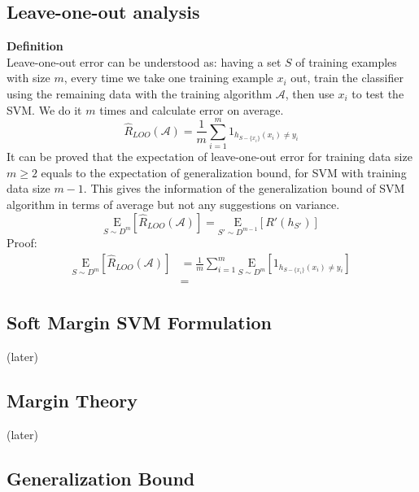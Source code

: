 \documentclass[12pt]{article}
\theoremstyle{definition}
\theoremstyle{remark}
\numberwithin{equation}{section}
\begin{document}
\subsection{Leave-one-out analysis}
\textbf{Definition} \\[0.2cm]
Leave-one-out error can be understood as: having a set $S$ of training examples with size $m$, every time we take one training example $x_i$ out, train the classifier using the remaining data with the training algorithm $\mathcal{A}$, then use $x_i$ to test the SVM. We do it $m$ times and calculate error on average.
\[\widehat{R}_{LOO}(\mathcal{A})=\frac{1}{m}\sum_{i=1}^{m}1_{h_{S-\{x_i\}}(x_i)\neq y_i}\]
It can be proved that the expectation of leave-one-out error for training data size $m\geq 2$ equals to the expectation of generalization bound, for SVM with training data size $m-1$. This gives the information of the generalization bound of SVM algorithm in terms of average but not any suggestions on variance. 
\[\underset{S\sim D^m}{\mathrm{E}}[\widehat{R}_{LOO}(\mathcal{A})]=\underset{S'\sim D^{m-1}}{\mathrm{E}}[R'(h_{S'})]\]
Proof:
\begin{align*}
\underset{S\sim D^m}{\mathrm{E}} [\widehat{R}_{LOO}(\mathcal{A})]  &= \frac{1}{m} \sum_{i=1}^m \underset{S \sim D^m}{\mathrm{E}}[1_{h_{S-\{x_i\}}(x_i)\neq y_i}] \\
                                                                   &=
\end{align*}
\subsection{Soft Margin SVM Formulation}
(later)
\subsection{Margin Theory}
(later)
\subsection{Generalization Bound}
\end{document}
